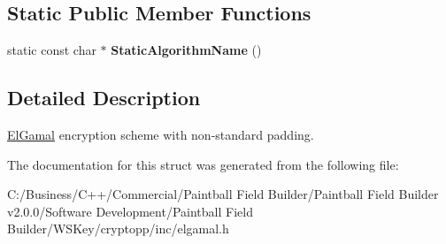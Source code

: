 \subsection*{Static Public Member Functions}
\begin{DoxyCompactItemize}
\item 
\hypertarget{struct_el_gamal_ab2e9a64fa0598b30d8f715bb1dc66161}{
static const char $\ast$ {\bfseries StaticAlgorithmName} ()}
\label{struct_el_gamal_ab2e9a64fa0598b30d8f715bb1dc66161}

\end{DoxyCompactItemize}


\subsection{Detailed Description}
\hyperlink{struct_el_gamal}{ElGamal} encryption scheme with non-\/standard padding. 

The documentation for this struct was generated from the following file:\begin{DoxyCompactItemize}
\item 
C:/Business/C++/Commercial/Paintball Field Builder/Paintball Field Builder v2.0.0/Software Development/Paintball Field Builder/WSKey/cryptopp/inc/elgamal.h\end{DoxyCompactItemize}
